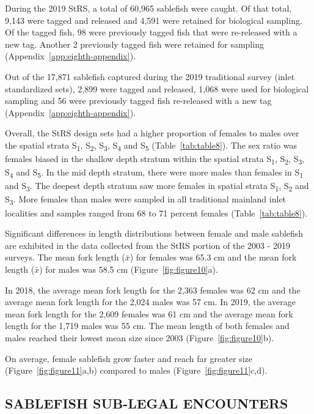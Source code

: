 \documentclass[12pt]{article}\usepackage[]{graphicx}\usepackage[]{color}
\begin{document}
During the 2019 StRS, a total of 60,965 sablefish were caught. Of that total, 9,143 were tagged and released and 4,591 were retained for biological sampling. Of the tagged fish, 98 were previously tagged fish that were re-released with a new tag. Another 2 previously tagged fish were retained for sampling (Appendix~\ref{app:eighth-appendix}).

Out of the 17,871 sablefish captured during the 2019 traditional survey (inlet standardized sets), 2,899 were tagged and released, 1,068 were used for biological sampling and 56 were previously tagged fish re-released with a new tag (Appendix~\ref{app:eighth-appendix}).

Overall, the StRS design sets had a higher proportion of females to males over the spatial strata S\textsubscript{1}, S\textsubscript{2}, S\textsubscript{3}, S\textsubscript{4} and S\textsubscript{5} (Table~\ref{tab:table8}). The sex ratio was females biased in the shallow depth stratum within the spatial strata S\textsubscript{1}, S\textsubscript{2}, S\textsubscript{3}, S\textsubscript{4} and S\textsubscript{5}. In the mid depth stratum, there were more males than females in S\textsubscript{1} and S\textsubscript{3}. The deepest depth stratum saw more females in spatial strata S\textsubscript{1}, S\textsubscript{2} and S\textsubscript{3}. More females than males were sampled in all traditional mainland inlet localities and samples ranged from 68 to 71 percent females (Table~\ref{tab:table8}).

Significant differences in length distributions between female and male sablefish are exhibited in the data collected from the StRS portion of the 2003 - 2019 surveys. The mean fork length (\(\bar{x}\)) for females was 65.3 cm and the mean fork length (\(\bar{x}\)) for males was 58.5 cm (Figure~\ref{fig:figure10}a).

In 2018, the average mean fork length for the 2,363 females was 62 cm and the average mean fork length for the 2,024 males was 57 cm. In 2019, the average mean fork length for the 2,609 females was 61 cm and the average mean fork length for the 1,719 males was 55 cm. The mean length of both females and males reached their lowest mean size since 2003 (Figure~\ref{fig:figure10}b).

On average, female sablefish grow faster and reach far greater size (Figure~\ref{fig:figure11}a,b) compared to males (Figure~\ref{fig:figure11}c,d).

\hypertarget{sablefish-sub-legal-encounters}{%
\subsection{SABLEFISH SUB-LEGAL ENCOUNTERS}\label{sablefish-sub-legal-encounters}}
\end{document}
